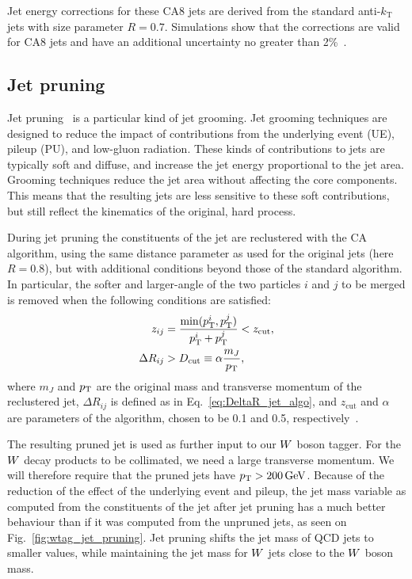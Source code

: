 Jet energy corrections for these CA8 jets are derived from the standard anti-$k_\textrm{T}$ jets
with size parameter $R=0.7$. Simulations show that the corrections are valid for CA8 jets and
have an additional uncertainty no greater than 2\%~\cite{CMS-PAS-JME-13-007,CMS-AN2012-393}.  


\subsection{Jet pruning}

Jet pruning~\cite{Ellis:2009su,Ellis:2009me} is a particular kind of jet grooming. Jet grooming
techniques are designed to reduce the impact of contributions from the underlying event (UE), pileup
(PU), and low-\pt gluon radiation. These kinds of contributions to jets are typically soft and
diffuse, and increase the jet energy proportional to the jet area. Grooming techniques reduce the
jet area without affecting the core components. This means that the resulting jets are less
sensitive to these soft contributions, but still reflect the kinematics of the original, hard
process.


During jet pruning the constituents of the jet are reclustered with the CA algorithm, using the
same distance parameter as used for the original jets (here $R=0.8$), but with additional conditions
beyond those of the standard algorithm.
In particular, the softer and larger-angle of the two particles $i$ and $j$ to be merged is removed
when the following conditions are satisfied:
\begin{align}
  z_{ij} &= \frac{\min( p_{\mathrm{T}}^i , p_{\mathrm{T}}^j )}{p_{\mathrm{T}}^i + p_{\mathrm{T}}^j} < z_{\textrm{cut}}, \\
  \Delta R_{ij} &> D_{\textrm{cut}} \equiv \alpha \frac{m_J}{p_{\mathrm{T}}} ,
\end{align}
where $m_J$ and $p_{\mathrm{T}}$ are the original mass and transverse momentum of the reclustered jet,
$\Delta R_{ij}$ is defined as in Eq.~\ref{eq:DeltaR_jet_algo}, and
$z_\textrm{cut}$ and $\alpha$ are parameters of the algorithm, chosen to be 0.1 and 0.5,
respectively~\cite{Chatrchyan:2013vbb}. 

The resulting pruned jet is used as further input to our $W$ boson tagger. For the $W$ decay
products to be collimated, we need a large transverse momentum. We will therefore require that the
pruned jets have $p_{\mathrm{T}} > 200\,\text{Ge\hspace{-.08em}V}$. 
Because of the reduction of the effect of the underlying event and pileup, the jet mass variable as
computed from the
constituents of the jet after jet pruning has a much better behaviour than if it was computed from
the unpruned jets, as seen on Fig.~\ref{fig:wtag_jet_pruning}. Jet pruning shifts the jet mass of
QCD jets
to smaller values, while maintaining the jet mass for $W$ jets close to the $W$ boson mass.

